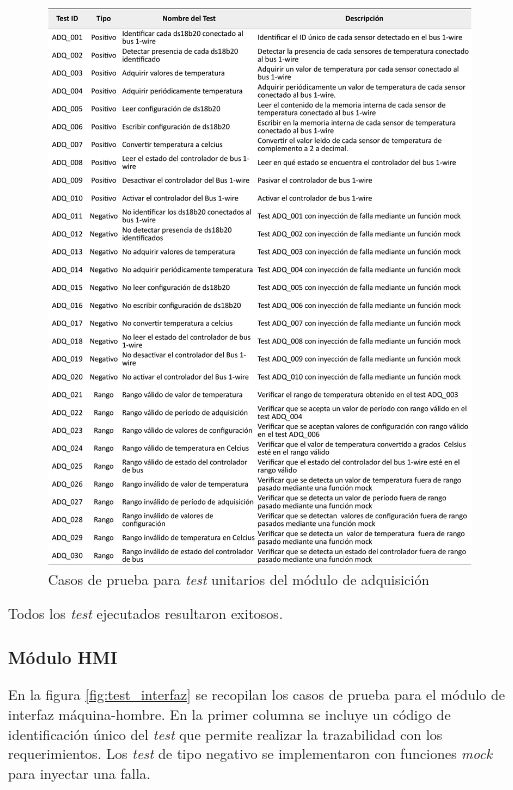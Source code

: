 \begin{figure}[!htpb]
	\centering
	\includegraphics[width=\textwidth]{./Figures/TestADQ.pdf}
	\caption{Casos de prueba para \textit{test} unitarios del módulo de adquisición}
	\label{fig:test_adquisición}
\end{figure}

Todos los \textit{test} ejecutados resultaron exitosos.

\subsubsection{Módulo HMI}


En la figura \ref{fig:test_interfaz} se recopilan los casos de prueba para el módulo de interfaz máquina-hombre.  En la primer columna se incluye un código de identificación único del \textit{test} que permite realizar la trazabilidad con los requerimientos. Los \textit{test} de tipo negativo se implementaron con funciones \textit{mock} para inyectar una falla.

